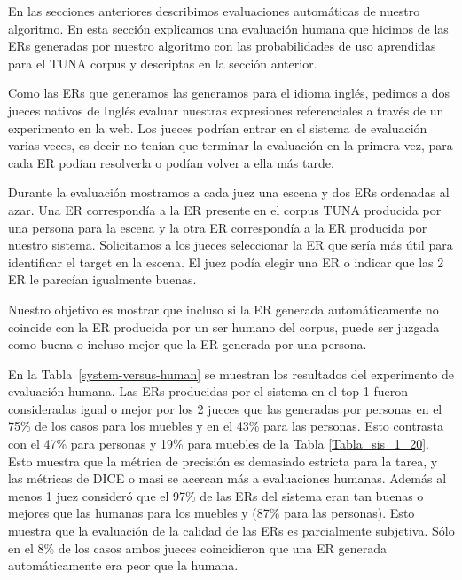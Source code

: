 \begin{table}[H]
En las secciones anteriores describimos evaluaciones autom\'aticas de nuestro algoritmo. En esta secci\'on explicamos una evaluaci\'on humana que hicimos de las ERs generadas por nuestro algoritmo con las probabilidades de uso aprendidas para el TUNA corpus y descriptas en la secci\'on anterior.  

Como las ERs que generamos las generamos para el idioma ingl\'es, pedimos a dos jueces nativos de Ingl\'es evaluar nuestras expresiones referenciales a trav\'es de un experimento en la web. Los jueces podr\'{i}an entrar en el sistema de evaluaci\'on varias veces, es decir no ten\'ian que terminar la evaluaci\'on en la primera vez, para cada ER pod\'ian resolverla o pod\'ian volver a ella m\'as tarde. 

Durante la evaluaci\'on mostramos a cada juez una escena y dos ERs ordenadas al azar. Una ER correspond\'ia a la ER presente en el corpus TUNA producida por una persona para la escena y la otra ER correspond\'ia a la ER producida por nuestro sistema. Solicitamos a los jueces seleccionar la ER que ser\'{i}a m\'as \'util para identificar el target en la escena. El juez pod\'ia elegir una ER o indicar que las 2 ER le parec\'ian igualmente buenas.

Nuestro objetivo es mostrar que incluso si la ER generada autom\'aticamente no coincide con la ER producida por un ser humano del corpus, puede ser juzgada como buena o incluso mejor que la ER generada por una persona.

En la Tabla~\ref{system-versus-human} se muestran los resultados del experimento de evaluaci\'on humana.
Las ERs producidas por el sistema en el top 1 fueron consideradas igual o mejor por los 2 jueces que las generadas por personas en el 75\% de los casos para los muebles y en el 43\% para las personas. Esto contrasta con el 47\% para personas y 19\% para muebles de la Tabla \ref{Tabla_sis_1_20}. Esto muestra que la m\'etrica de precisi\'on es demasiado estricta para la tarea, y las m\'etricas de DICE o masi se acercan m\'as a evaluaciones humanas. Adem\'as al menos 1 juez consider\'o que el 97\% de las ERs del sistema eran tan buenas o mejores que las humanas para los muebles y (87\% para las personas). Esto muestra que la evaluaci\'on de la calidad de las ERs es parcialmente subjetiva. S\'olo en el 8\% de los casos ambos jueces coincidieron que una ER generada autom\'aticamente era peor que la humana.


\end{table}
